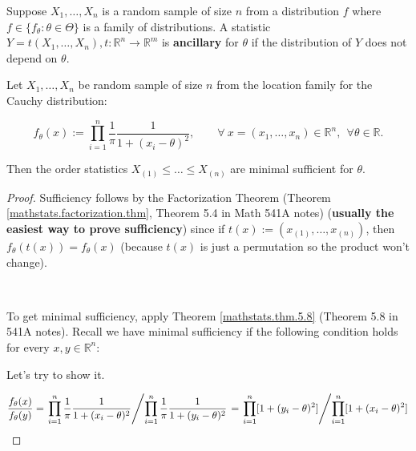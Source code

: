 \begin{definition} Suppose \(X_1, \ldots, X_n\) is a random sample of size \(n\) from a distribution \(f\) where \(f \in \{f_\theta: \theta \in \Theta\}\) is a family of distributions. A statistic \(Y = t(X_1, \ldots, X_n), t: \mathbb{R}^n \to \mathbb{R}^m\) is \textbf{ancillary} for \(\theta\) if the distribution of \(Y\) does not depend on \(\theta\).

\end{definition}

\begin{example} Let \(X_1, \ldots, X_n\) be random sample of size \(n\) from the location family for the Cauchy distribution:

\[
f_\theta(x) := \prod_{i=1}^n \frac{1}{\pi} \frac{1}{1 + (x_i - \theta)^2}, \qquad \forall \ x = (x_1, \ldots, x_n) \in \mathbb{R}^n, \ \ \forall \theta \in \mathbb{R}.
\]

Then the order statistics \(X_{(1)} \leq \ldots \leq X_{(n)}\) are minimal sufficient for \(\theta\). 

\begin{proof} Sufficiency follows by the Factorization Theorem (Theorem \ref{mathstats.factorization.thm}, Theorem 5.4 in Math 541A notes) (\textbf{usually the easiest way to prove sufficiency}) since if \(t(x) := (x_{(1)}, \ldots, x_{(n)})\), then \(f_\theta(t(x)) = f_\theta(x)\) (because \(t(x)\) is just a permutation so the product won't change).

\

To get minimal sufficiency, apply Theorem \ref{mathstats.thm.5.8} (Theorem 5.8 in 541A notes). Recall we have minimal sufficiency if the following condition holds for every \(x, y \in \mathbb{R}^n\):

\noindent{}

Let's try to show it.

\begin{equation}\label{mathstats.example.5.15.proof}
\frac{f_\theta(x)}{f_\theta(y)} = \left. \prod_{i=1}^n \frac{1}{\pi} \frac{1}{1 + (x_i - \theta)^2} \middle/  \prod_{i=1}^n \frac{1}{\pi} \frac{1}{1 + (y_i - \theta)^2} \right. = \left. \prod_{i=1}^n[ 1 + (y_i - \theta)^2] \middle/  \prod_{i=1}^n[1 + (x_i - \theta)^2] \right.
\end{equation}


\end{proof}
\end{example}

